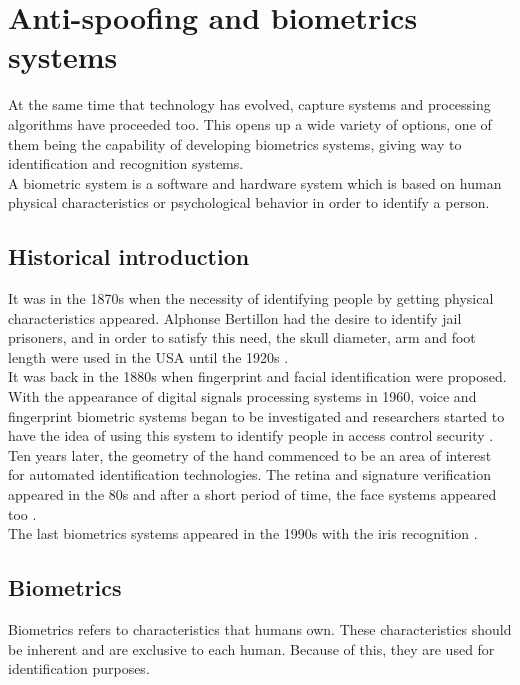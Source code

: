 \section{Anti-spoofing and biometrics systems}
At the same time that technology has evolved, capture systems and processing algorithms have proceeded too. This opens up a wide variety of options,  one of them being the capability of developing biometrics systems, giving way to identification and recognition systems.\\

A biometric system is a software and hardware system which is based on human physical characteristics or psychological behavior in order to identify a person.

\subsection{Historical introduction}
It was in the 1870s when the necessity of identifying people by getting physical characteristics appeared. Alphonse Bertillon had the desire to identify jail prisoners, and in order to satisfy this need, the skull diameter, arm and foot length were used in the USA until the 1920s \cite{Intro_biometrics}.\\

It was back in the 1880s when fingerprint and facial identification were proposed. With the appearance of digital signals processing systems in 1960, voice and fingerprint biometric systems began to be investigated and researchers started to have the idea of using this system to identify people in access control security \cite{Intro_biometrics}.\\

Ten years later, the geometry of the hand commenced to be an area of interest for automated identification technologies. The retina and signature verification appeared in the 80s and after a short period of time, the face systems appeared too \cite{Intro_biometrics}.\\

The last biometrics systems appeared in the 1990s with the iris recognition \cite{Intro_biometrics}.

\subsection{Biometrics}
Biometrics refers to characteristics that humans own. These characteristics should be inherent and are exclusive to each human. Because of this, they are used for identification purposes.\\

